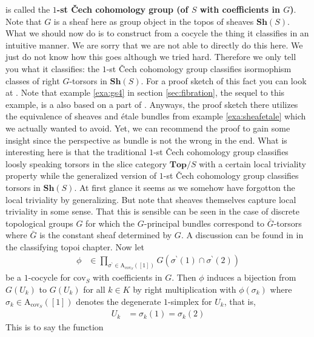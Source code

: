 \begin{exa}
is called the \textbf{$1$-st \v{C}ech cohomology group (of $S$ with coefficients in $G$)}. Note that $G$ is a sheaf here as group object in the topos of sheaves $\mathbf{Sh}(S)$. What we should now do is to construct from a cocycle the thing it classifies in an intuitive manner. We are sorry that we are not able to directly do this here. We just do not know how this goes although we tried hard. Therefore we only tell you what it classifies: the $1$-st \v{C}ech cohomology group classifies isormophism classes of right $G$-torsors in $\mathbf{Sh}(S)$. For a proof sketch of this fact you can look at \cite{c82f5e22}. Note that example \ref{exa:gs4} in section \ref{sec:fibration}, the sequel to this example, is a also based on a part of \cite{c82f5e22}. Anyways, the proof sketch there utilizes the equivalence of sheaves and \'{e}tale bundles from example \ref{exa:sheafetale} which we actually wanted to avoid. Yet, we can recommend the proof to gain some insight since the perspective as bundle is not the wrong in the end. What is interesting here is that the traditional $1$-st \v{C}ech cohomology group classifies loosly speaking torsors in the slice category $\mathbf{Top} \slash S$ with a certain local triviality property while the generalized version of $1$-st \v{C}ech cohomology group classifies torsors in $\mathbf{Sh}(S)$. At first glance it seems as we somehow have forgotton the local triviality by generalizing. But note that sheaves themselves capture local triviality in some sense. That this is sensible can be seen in the case of discrete topological groups $G$ for which the $G$-principal bundles correspond to $\bar{G}$-torsors where $\bar{G}$ is the constant sheaf determined by $G$. A discussion can be found in \cite{c55c71e8} in the classifying topoi chapter.
\iffalse
Now let
\begin{align*}
  \phi
  &\in
  \prod_{\sigma^{\backprime} \in \mathrm{A}_{\mathrm{cov}_{S}}([1])}
  G(\sigma^{\backprime}(1) \cap \sigma^{\backprime}(2))
\end{align*}
be a $1$-cocycle for $\mathrm{cov}_{S}$ with coefficients in $G$. Then $\phi$ induces a bijection from $G(U_{k})$ to $G(U_{k})$ for all $k \in K$ by right multiplication with $\phi(\sigma_{k})$ where $\sigma_{k} \in \mathrm{A}_{\mathrm{cov}_{S}}([1])$ denotes the degenerate $1$-simplex for $U_{k}$, that is,
\begin{align*}
  U_{k}
  &=
  \sigma_{k}(1)
  =
  \sigma_{k}(2)
\end{align*}
This is to say the function
\begin{align*}

\end{align*}
\end{exa}
